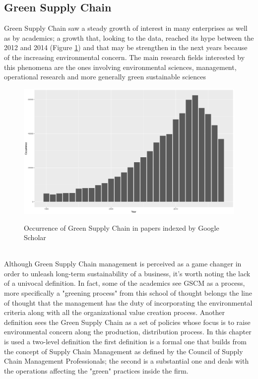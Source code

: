 \begin{doublespace}
\pagebreak

\section{Green Supply Chain}
Green Supply Chain saw a steady growth of interest in many enterprises\cite{Diabat2011} as well as by academics; a growth that, looking to the data\cite{Strobel18}, reached its hype between the 2012 and 2014 (Figure \ref{fig:occurrence}) and that may be strengthen in the next years because of the increasing environmental concern. The main research fields interested by this phenomena are the ones involving environmental sciences, management, operational research and more generally green sustainable sciences\cite{Shan2018}  
\begin{figure}[ht]
	\includegraphics[width=\textwidth]{Images/occurence.png}	
	\label{fig:occurrence}
	\caption{Occurrence of Green Supply Chain in papers indexed by Google Scholar}	
\end{figure}
\\
Although Green Supply Chain management is perceived as a game changer in order to unleash long-term sustainability of a business, it's worth noting the lack of a univocal definition. In fact, some of the academics see GSCM as a process\cite{Gilbert2001}, more specifically a "greening process" from this school of thought belongs the line of thought that the management has the duty of incorporating the environmental criteria along with all the organizational value creation process. Another definition sees the Green Supply Chain as a set of policies whose focus is to raise environmental concern along the production, distribution process\cite{Zsidisin2001}. In this chapter is used a two-level definition the first definition is a formal one that builds from the concept of Supply Chain Management as defined by the Council of Supply Chain Management Professionals; the second is a substantial one and deals with the operations affecting the "green" practices inside the firm.

\end{doublespace}
